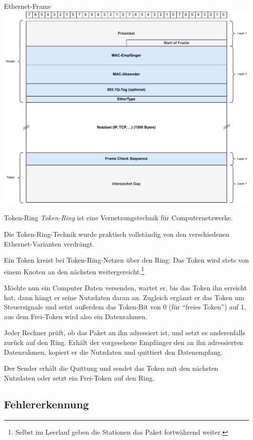 \begin{defi}{Ethernet-Frame}
    \centering
    \includegraphics[width=.9\textwidth]{includes/figures/defi_ethernet_frame.pdf}
\end{defi}

\begin{bonus}{Token-Ring}
    \emph{Token-Ring} ist eine Vernetzungstechnik für Computernetzwerke.

    Die Token-Ring-Technik wurde praktisch vollständig von den verschiedenen Ethernet-Varianten verdrängt.

    Ein Token kreist bei Token-Ring-Netzen über den Ring: Das Token wird stets von einem Knoten an den nächsten weitergereicht.\footnote{Selbst im Leerlauf geben die Stationen das Paket fortwährend weiter.}

    Möchte nun ein Computer Daten versenden, wartet er, bis das Token ihn erreicht hat, dann hängt er seine Nutzdaten daran an.
    Zugleich ergänzt er das Token um Steuersignale und setzt außerdem das Token-Bit von 0 (für \enquote{freies Token}) auf 1, aus dem Frei-Token wird also ein Datenrahmen.

    Jeder Rechner prüft, ob das Paket an ihn adressiert ist, und setzt es anderenfalls zurück auf den Ring.
    Erhält der vorgesehene Empfänger den an ihn adressierten Datenrahmen, kopiert er die Nutzdaten und quittiert den Datenempfang.

    Der Sender erhält die Quittung und sendet das Token mit den nächsten Nutzdaten oder setzt ein Frei-Token auf den Ring.
\end{bonus}

\subsection{Fehlererkennung}

